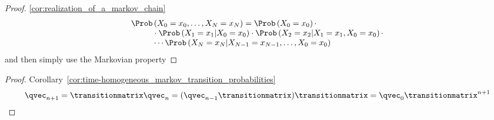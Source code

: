 \begin{proofbox}\nospacing
  \begin{proof}\label{proof:cor:realization_of_a_markov_chain}\cref{cor:realization_of_a_markov_chain}
    \begin{align*}
      \Prob&\left(X_{0}=x_{0},\ldots,X_{N}=x_{N}\right)=\Prob\left(X_{0}=x_{0}\right)\cdot\\[-1\jot]
           &\cdot\Prob \left(X_{1}=x_{1}|X_{0}=x_{0}\right)\cdot\Prob \left(X_{2}=x_{2}|X_{1}=x_{1},X_{0}=x_{0}\right)\cdot \\[-1\jot]
           &\cdots\Prob \left(X_{N}=x_{N}|X_{N-1}=x_{N-1},\ldots,X_{0}=x_{0}\right)
    \end{align*}
    and then simply use the Markovian property
  \end{proof}
\end{proofbox}
\begin{proofbox}\nospacing
  \begin{proof}Corollary~\ref{cor:time-homogeneous_markov_transition_probabilities}\label{proof:cor:time-homogeneous_markov_transition_probabilities}
    \begin{align*}
      \qvec_{n+1}=\transitionmatrix\qvec_{n}=(\qvec_{n-1}\transitionmatrix)\transitionmatrix=\qvec_{0}\transitionmatrix^{n+1}
    \end{align*}
  \end{proof}
\end{proofbox}



